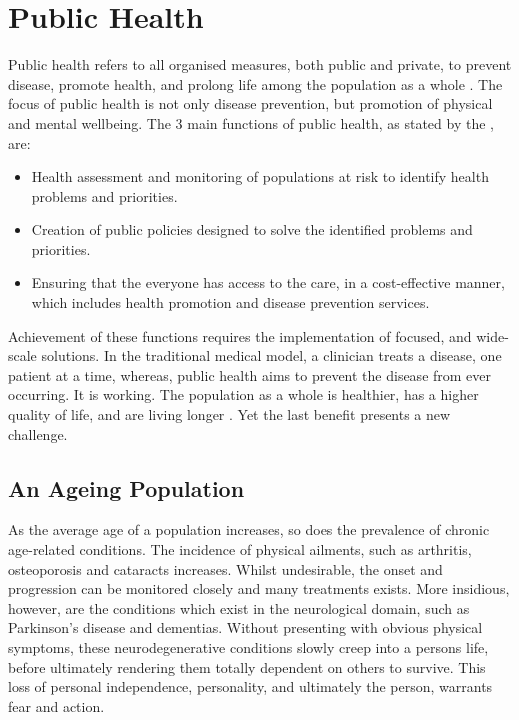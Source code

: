  \label{chapter: introduction}

\section{Public Health}
Public health refers to all organised measures, both public and private, to prevent disease, promote health, and prolong life among the population as a whole \cite{WorldHealthOrganisation2016}.
The focus of public health is not only disease prevention, but promotion of physical and mental wellbeing. The 3 main functions of public health, as stated by the \citeauthor{WorldHealthOrganisation2016}, are:

\begin{itemize}
	\item Health assessment and monitoring of populations at risk to identify health problems and priorities.
	\item Creation of public policies designed to solve the identified problems and priorities.
	\item Ensuring that the everyone has access to the care, in a cost-effective manner, which includes health promotion and disease prevention services.
\end{itemize}

Achievement of these functions requires the implementation of focused, and wide-scale solutions. In the traditional medical model, a clinician treats a disease, one patient at a time, whereas, public health aims to prevent the disease from ever occurring. It is working. The population as a whole is healthier, has a higher quality of life, and are living longer \cite{Uhlenberg2009}. Yet the last benefit presents a new challenge.

\subsection{An Ageing Population}
As the average age of a population increases, so does the prevalence of chronic age-related conditions. The incidence of physical ailments, such as arthritis, osteoporosis and cataracts increases. Whilst undesirable, the onset and progression can be monitored closely and many treatments exists. More insidious, however, are the conditions which exist in the neurological domain, such as Parkinson's disease and dementias. Without presenting with obvious physical symptoms, these neurodegenerative conditions slowly creep into a persons life, before ultimately rendering them totally dependent on others to survive. This loss of personal independence, personality, and ultimately the person, warrants fear and action.

